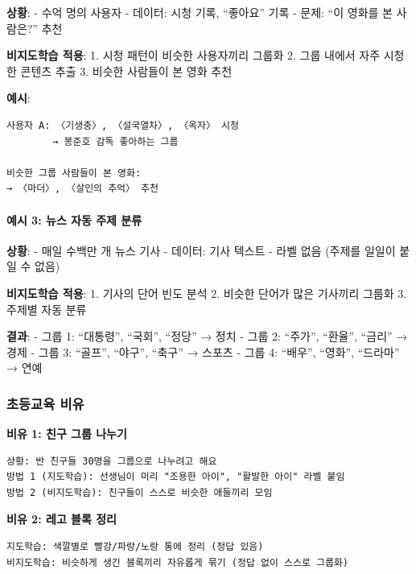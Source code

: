 \documentclass[a4paper, 11pt]{article}
\begin{document}
\textbf{상황}: - 수억 명의 사용자 - 데이터: 시청 기록, ``좋아요'' 기록 -
문제: ``이 영화를 본 사람은?'' 추천

\textbf{비지도학습 적용}: 1. 시청 패턴이 비슷한 사용자끼리 그룹화 2.
그룹 내에서 자주 시청한 콘텐츠 추출 3. 비슷한 사람들이 본 영화 추천

\textbf{예시}:

\begin{verbatim}
사용자 A: 〈기생충〉, 〈설국열차〉, 〈옥자〉 시청
        → 봉준호 감독 좋아하는 그룹

비슷한 그룹 사람들이 본 영화:
→ 〈마더〉, 〈살인의 추억〉 추천
\end{verbatim}

\hypertarget{uxc608uxc2dc-3-uxb274uxc2a4-uxc790uxb3d9-uxc8fcuxc81c-uxbd84uxb958}{%
\paragraph{예시 3: 뉴스 자동 주제
분류}\label{uxc608uxc2dc-3-uxb274uxc2a4-uxc790uxb3d9-uxc8fcuxc81c-uxbd84uxb958}}

\textbf{상황}: - 매일 수백만 개 뉴스 기사 - 데이터: 기사 텍스트 - 라벨
없음 (주제를 일일이 붙일 수 없음)

\textbf{비지도학습 적용}: 1. 기사의 단어 빈도 분석 2. 비슷한 단어가 많은
기사끼리 그룹화 3. 주제별 자동 분류

\textbf{결과}: - 그룹 1: ``대통령'', ``국회'', ``정당'' → 정치 - 그룹 2:
``주가'', ``환율'', ``금리'' → 경제 - 그룹 3: ``골프'', ``야구'',
``축구'' → 스포츠 - 그룹 4: ``배우'', ``영화'', ``드라마'' → 연예

\hypertarget{uxcd08uxb4f1uxad50uxc721-uxbe44uxc720}{%
\subsubsection{초등교육
비유}\label{uxcd08uxb4f1uxad50uxc721-uxbe44uxc720}}

\textbf{비유 1: 친구 그룹 나누기}

\begin{verbatim}
상황: 반 친구들 30명을 그룹으로 나누려고 해요
방법 1 (지도학습): 선생님이 미리 "조용한 아이", "활발한 아이" 라벨 붙임
방법 2 (비지도학습): 친구들이 스스로 비슷한 애들끼리 모임
\end{verbatim}

\textbf{비유 2: 레고 블록 정리}

\begin{verbatim}
지도학습: 색깔별로 빨강/파랑/노랑 통에 정리 (정답 있음)
비지도학습: 비슷하게 생긴 블록끼리 자유롭게 묶기 (정답 없이 스스로 그룹화)
\end{verbatim}
\end{document}
